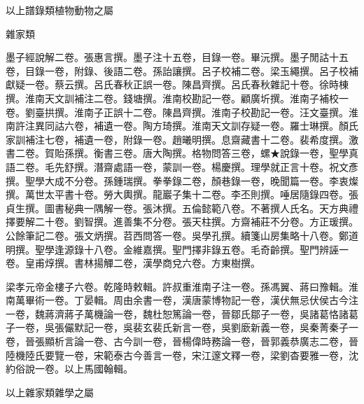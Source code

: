 \begin{pinyinscope}
以上譜錄類植物動物之屬

雜家類

墨子經說解二卷。張惠言撰。墨子注十五卷，目錄一卷。畢沅撰。墨子閒詁十五卷，目錄一卷，附錄、後語二卷。孫詒讓撰。呂子校補二卷。梁玉繩撰。呂子校補獻疑一卷。蔡云撰。呂氏春秋正誤一卷。陳昌齊撰。呂氏春秋雜記十卷。徐時棟撰。淮南天文訓補注二卷。錢塘撰。淮南校勘記一卷。顧廣圻撰。淮南子補校一卷。劉臺拱撰。淮南子正誤十二卷。陳昌齊撰。淮南子校勘記一卷。汪文臺撰。淮南許注異同詁六卷，補遺一卷。陶方琦撰。淮南天文訓存疑一卷。羅士琳撰。顏氏家訓補注七卷，補遺一卷，附錄一卷。趙曦明撰。息齋藏書十二卷。裴希度撰。激書二卷。賀貽孫撰。衡書三卷。唐大陶撰。格物問答三卷，螺★說錄一卷，聖學真語二卷。毛先舒撰。潛齋處語一卷，蒙訓一卷。楊慶撰。理學就正言十卷。祝文彥撰。聖學大成不分卷。孫鍾瑞撰。拳拳錄二卷，顏巷錄一卷，晚聞篇一卷。李衷燦撰。萬世太平書十卷。勞大輿撰。龍巖子集十二卷。李丕則撰。唾居隨錄四卷。張貞生撰。圖書秘典一隅解一卷。張沐撰。五倫懿範八卷。不著撰人氏名。天方典禮擇要解二十卷。劉智撰。進善集不分卷。張天柱撰。方齋補莊不分卷。方正瑗撰。公餘筆記二卷。張文炳撰。苕西問答一卷。吳學孔撰。續箋山房集略十八卷。鄭道明撰。聖學逢源錄十八卷。金維嘉撰。聖門擇非錄五卷。毛奇齡撰。聖門辨誣一卷。皇甫焞撰。書林揚觶二卷，漢學商兌六卷。方東樹撰。

梁孝元帝金樓子六卷。乾隆時敕輯。許叔重淮南子注一卷。孫馮翼、蔣曰豫輯。淮南萬畢術一卷。丁晏輯。周由余書一卷，漢唐蒙博物記一卷，漢伏無忌伏侯古今注一卷，魏蔣濟蔣子萬機論一卷，魏杜恕篤論一卷，晉鄒氏鄒子一卷，吳諸葛恪諸葛子一卷，吳張儼默記一卷，吳裴玄裴氏新言一卷，吳劉廞新義一卷，吳秦菁秦子一卷，晉張顯析言論一卷、古今訓一卷，晉楊偉時務論一卷，晉郭義恭廣志二卷，晉陸機陸氏要覽一卷，宋範泰古今善言一卷，宋江邃文釋一卷，梁劉杳要雅一卷，沈約俗說一卷。以上馬國翰輯。

以上雜家類雜學之屬


\end{pinyinscope}
